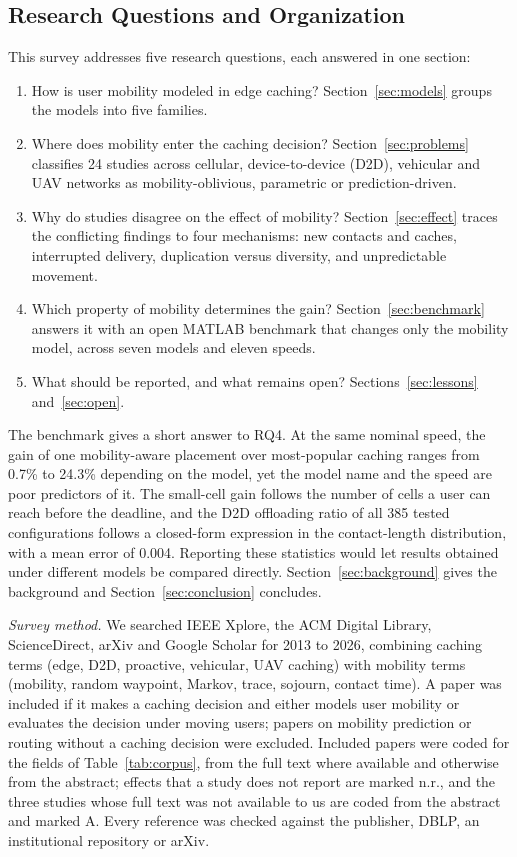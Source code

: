 \subsection{Research Questions and Organization}
\label{subsec:contrib}

This survey addresses five research questions, each answered in one section:
\begin{enumerate}
\item[RQ1] How is user mobility modeled in edge caching? Section~\ref{sec:models} groups the models into five families.
\item[RQ2] Where does mobility enter the caching decision? Section~\ref{sec:problems} classifies 24 studies across cellular, device-to-device (D2D), vehicular and UAV networks as mobility-oblivious, parametric or prediction-driven.
\item[RQ3] Why do studies disagree on the effect of mobility? Section~\ref{sec:effect} traces the conflicting findings to four mechanisms: new contacts and caches, interrupted delivery, duplication versus diversity, and unpredictable movement.
\item[RQ4] Which property of mobility determines the gain? Section~\ref{sec:benchmark} answers it with an open MATLAB benchmark that changes only the mobility model, across seven models and eleven speeds.
\item[RQ5] What should be reported, and what remains open? Sections~\ref{sec:lessons} and~\ref{sec:open}.
\end{enumerate}

The benchmark gives a short answer to RQ4. At the same nominal speed, the gain of one mobility-aware placement over most-popular caching ranges from 0.7\% to 24.3\% depending on the model, yet the model name and the speed are poor predictors of it. The small-cell gain follows the number of cells a user can reach before the deadline, and the D2D offloading ratio of all 385 tested configurations follows a closed-form expression in the contact-length distribution, with a mean error of 0.004. Reporting these statistics would let results obtained under different models be compared directly. Section~\ref{sec:background} gives the background and Section~\ref{sec:conclusion} concludes.

\emph{Survey method.} We searched IEEE Xplore, the ACM Digital Library, ScienceDirect, arXiv and Google Scholar for 2013 to 2026, combining caching terms (edge, D2D, proactive, vehicular, UAV caching) with mobility terms (mobility, random waypoint, Markov, trace, sojourn, contact time). A paper was included if it makes a caching decision and either models user mobility or evaluates the decision under moving users; papers on mobility prediction or routing without a caching decision were excluded. Included papers were coded for the fields of Table~\ref{tab:corpus}, from the full text where available and otherwise from the abstract; effects that a study does not report are marked n.r., and the three studies whose full text was not available to us are coded from the abstract and marked A. Every reference was checked against the publisher, DBLP, an institutional repository or arXiv. %
